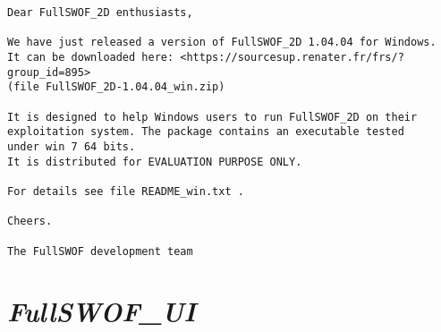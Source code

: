 \documentclass[a4paper, 11pt]{article}
\newcommand{\FullSWOFUI}{\emph{FullSWOF\_UI}}
\begin{document}
\begin{enumerate}
\begin{verbatim}
Dear FullSWOF_2D enthusiasts,

We have just released a version of FullSWOF_2D 1.04.04 for Windows.
It can be downloaded here: <https://sourcesup.renater.fr/frs/?group_id=895>
(file FullSWOF_2D-1.04.04_win.zip)

It is designed to help Windows users to run FullSWOF_2D on their 
exploitation system. The package contains an executable tested
under win 7 64 bits.
It is distributed for EVALUATION PURPOSE ONLY.

For details see file README_win.txt .

Cheers.

The FullSWOF development team 
\end{verbatim}
\end{enumerate}


\section{\FullSWOFUI{}}
\end{document}
